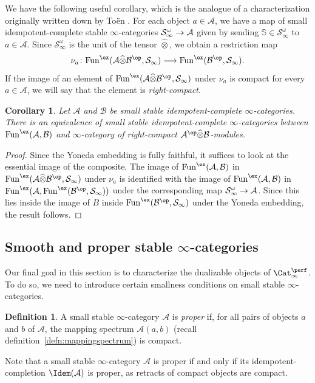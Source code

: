 \documentclass{amsart}
\renewcommand{\to}{\mathchoice{\longrightarrow}{\rightarrow}{\rightarrow}{\rightarrow}}
\let\catsymbfont\mathcal
\newcommand{\aA}{{\catsymbfont{A}}}
\newcommand{\aB}{{\catsymbfont{B}}}
\newcommand{\aS}{{\catsymbfont{S}}}
\newcommand{\bS}{\mathbb{S}}
\newcommand{\idemstabcat}{\Cat_\i^{\perf}}
\newcommand{\idemtimes}{\widehat{\otimes}}
\newcommand{\idemfun}{\Fun^{\ex}}
\newcommand{\Fun}{\mathrm{Fun}} %
\newcommand{\ispec}{\aS_{\infty}}
\renewcommand{\i}{\infty}
\numberwithin{equation}{section}
\newtheorem{corollary}[equation]{Corollary}
\theoremstyle{definition}
\newtheorem{definition}[equation]{Definition}
\begin{document}
We have the following useful corollary, which is the analogue of a
characterization originally written down by To\"en \cite{Toen}.  For
each object $a \in \aA$, we have a map of small idempotent-complete
stable $\infty$-categories $\ispec^\omega\to\aA$ given by sending
$\bS\in\ispec^\omega$ to $a\in\aA$.  Since $\ispec^\omega$ is the unit of
the tensor $\idemtimes$, we obtain a restriction map
\[
\nu_{a} \colon \Fun^{\ex}(\aA \idemtimes \aB^{\op},\ispec) \to
\Fun^{\ex}(\aB^{\op}, \ispec).
\]
If the image of an element of $\Fun^{\ex}(\aA \idemtimes
\aB^{\op},\ispec)$ under $\nu_a$ is compact for every $a \in \aA$, we will
say that the element is {\em right-compact}.

\begin{corollary}\label{cor:toencor}
Let $\aA$ and $\aB$ be small stable idempotent-complete
$\i$-categories.  There is an equivalence of small stable
idempotent-complete $\i$-categories between $\idemfun(\aA, \aB)$
and $\i$-category of right-compact $\aA^{\op} \idemtimes
\aB$-modules.
\end{corollary}

\begin{proof}
Since the Yoneda embedding is fully faithful, it suffices to look at
the essential image of the composite.  The image of
$\Fun^{\ex}(\aA, \aB)$ in $\Fun^{\ex}(\aA \idemtimes
\aB^{\op}, \ispec)$ under $\nu_a$ is identified with the image of
$\Fun^{\ex}(\aA, \aB)$ in $\Fun^{\ex}(\aA,
\Fun^{\ex}(\aB^{\op},\ispec))$ under the corresponding map $\ispec^\omega\to\aA$.
Since this lies inside the image of $B$ inside
$\Fun^{\ex}(\aB^{\op},\ispec)$ under the Yoneda embedding, the result
follows.
\end{proof}

\subsection{Smooth and proper stable $\i$-categories}
Our final goal in this section is to characterize the dualizable
objects of $\idemstabcat$.  To do so, we need to introduce certain
smallness conditions on small stable $\infty$-categories. 

\begin{definition}\label{def:proper}
A small stable $\infty$-category $\aA$ is {\em proper} if, for all pairs of objects $a$ and $b$ of $\aA$, the mapping spectrum $\aA(a,b)$ (recall
definition~\ref{defn:mappingspectrum}) is compact. 
\end{definition}

Note that a small stable $\infty$-category $\aA$ is proper if and only if its idempotent-completion $\Idem(\aA)$ is proper, as retracts of compact objects are compact.
\end{document}
